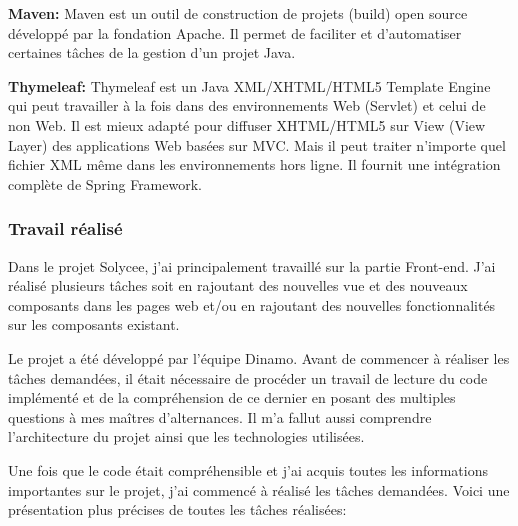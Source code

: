 \documentclass[12pt]{article}
\begin{document}
\textbf{Maven:} Maven est un outil de construction de projets (build) open source développé par la fondation Apache. Il permet de faciliter et d'automatiser certaines tâches de la gestion d'un projet Java.\newline

\textbf{Thymeleaf:} Thymeleaf est un  Java XML/XHTML/HTML5 Template Engine qui peut travailler à la fois dans des environnements Web (Servlet) et celui de non Web. Il est mieux adapté pour diffuser XHTML/HTML5 sur View (View Layer) des applications Web basées sur MVC. Mais il peut traiter n'importe quel fichier XML même dans les environnements hors ligne. Il fournit une intégration complète de Spring Framework. 

\subsubsection{Travail réalisé}

Dans le projet Solycee, j'ai principalement travaillé sur la partie Front-end. J'ai réalisé plusieurs tâches soit en rajoutant des nouvelles vue et des nouveaux composants dans les pages web et/ou en rajoutant des nouvelles fonctionnalités sur les composants existant.

Le projet a été développé par l'équipe Dinamo. Avant de commencer à réaliser les tâches demandées, il était nécessaire de procéder un travail  de lecture du code implémenté et de la compréhension de ce dernier en posant des multiples questions à mes maîtres d'alternances. Il m'a fallut aussi comprendre l'architecture du projet ainsi que les technologies utilisées. 

Une fois que le code était compréhensible et j'ai acquis toutes les informations importantes sur le projet, j'ai commencé à réalisé les tâches demandées.  Voici une présentation plus précises de toutes les tâches réalisées:   
\end{document}
